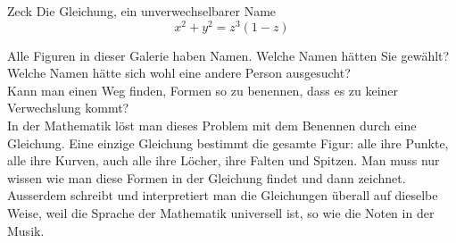 \begin{surferPage}{Zeck}
Die Gleichung, ein unverwechselbarer Name \\
\smallskip
\[x^2 + y^2	= z^3	(1 - z) \]


\singlespacing
Alle Figuren in dieser Galerie haben Namen. Welche Namen hätten Sie gewählt? Welche Namen hätte sich wohl eine andere Person ausgesucht?\\
\vspace{0.3cm}
Kann man einen Weg finden, Formen so zu benennen, dass es zu keiner Verwechslung kommt? \\
In der Mathematik löst man dieses Problem mit dem Benennen durch eine Gleichung. Eine einzige Gleichung bestimmt die gesamte Figur: alle ihre Punkte, alle ihre Kurven, auch alle ihre Löcher, ihre Falten und Spitzen. Man muss nur wissen wie man diese Formen in der Gleichung findet und dann zeichnet.\\

\vspace{0.3cm}
Ausserdem schreibt und interpretiert man die Gleichungen überall auf dieselbe Weise, weil die Sprache der Mathematik universell ist, so wie die Noten in der Musik.
\end{surferPage}
